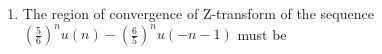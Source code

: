 \documentclass[journal,12pt,twocolumn]{IEEEtran}
\begin{document}
\begin{enumerate}
%

\item The region of convergence of Z-transform of the sequence $(\frac{5}{6})^{n}u(n)-(\frac{6}{5})^{n}u(-n-1)$ must be
\begin{enumerate}[(A)]
\end{enumerate}

%
%

%
%
%
%


\end{enumerate}
\end{document}
